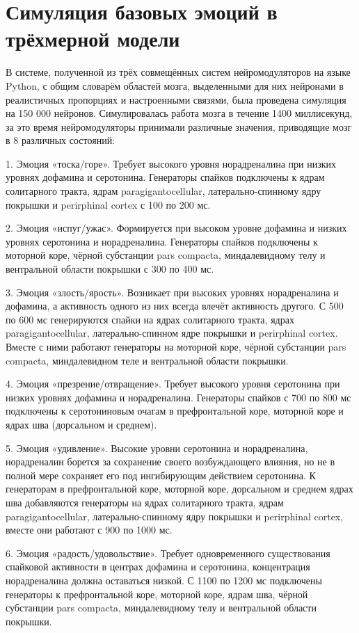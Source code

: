 \chapter{Симуляция базовых эмоций в трёхмерной модели}
\label{chap:results}
В системе, полученной из трёх совмещённых систем нейромодуляторов на языке Python, с общим словарём областей мозга, выделенными для них нейронами в реалистичных пропорциях и настроенными связями, была проведена симуляция на 150 000 нейронов. Симулировалась работа мозга в течение 1400 миллисекунд, за это время нейромодуляторы принимали различные значения, приводящие мозг в 8 различных состояний:


1. Эмоция «тоска/горе». Требует высокого уровня норадреналина при низких уровнях дофамина и серотонина. Генераторы спайков подключены к ядрам солитарного тракта, ядрам paragigantocellular, латерально-спинному ядру покрышки и perirphinal cortex с 100 по 200 мс.


2. Эмоция «испуг/ужас». Формируется при высоком уровне дофамина и низких уровнях серотонина и норадреналина. Генераторы спайков подключены к моторной коре, чёрной субстанции pars compacta, миндалевидному телу и вентральной области покрышки с 300 по 400 мс.


3. Эмоция «злость/ярость». Возникает при высоких уровнях норадреналина и  дофамина, а активность одного из них всегда влечёт активность другого. С 500 по 600 мс генерируются спайки на ядрах солитарного тракта, ядрах paragigantocellular, латерально-спинном ядре покрышки и perirphinal cortex. Вместе с ними работают генераторы на моторной коре, чёрной субстанции pars compacta, миндалевидном теле и вентральной области покрышки.


4. Эмоция «презрение/отвращение». Требует высокого уровня серотонина при низких уровнях дофамина и норадреналина. Генераторы спайков с 700 по 800 мс подключены к серотониновым очагам в префронтальной коре, моторной коре и ядрах шва (дорсальном и среднем).


5. Эмоция «удивление». Высокие уровни серотонина и норадреналина, норадреналин борется за сохранение своего возбуждающего влияния, но не в полной мере сохраняет его под ингибирующим действием серотонина. К генераторам в префронтальной коре, моторной коре, дорсальном и среднем ядрах шва добавляются генераторы на ядрах солитарного тракта, ядрам paragigantocellular, латерально-спинному ядру покрышки и perirphinal cortex, вместе они работают с 900 по 1000 мс.


6. Эмоция «радость/удовольствие». Требует одновременного существования спайковой активности в центрах дофамина и серотонина, концентрация норадреналина должна оставаться низкой. С 1100 по 1200 мс подключены генераторы к префронтальной коре, моторной коре, ядрам шва, чёрной субстанции pars compacta, миндалевидному телу и вентральной области покрышки.


